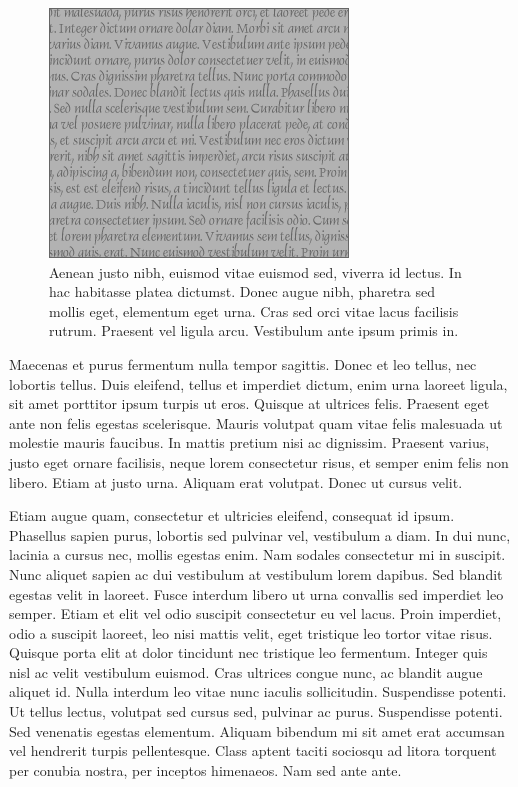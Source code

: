 \begin{figure}[t]
  \centering
  \includegraphics{figs/medium-rectangle-gray}
  \caption[Aenean justo nibh]{
    Aenean justo nibh, euismod vitae euismod sed, viverra id lectus.
In hac habitasse platea dictumst.
Donec augue nibh, pharetra sed mollis eget, elementum eget urna.
Cras sed orci vitae lacus facilisis rutrum.
Praesent vel ligula arcu.
Vestibulum ante ipsum primis in.
  }
\end{figure}

Maecenas et purus fermentum nulla tempor sagittis.
Donec et leo tellus, nec lobortis tellus.
Duis eleifend, tellus et imperdiet dictum, enim urna laoreet ligula, sit amet porttitor ipsum turpis ut eros.
Quisque at ultrices felis.
Praesent eget ante non felis egestas scelerisque.
Mauris volutpat quam vitae felis malesuada ut molestie mauris faucibus.
In mattis pretium nisi ac dignissim.
Praesent varius, justo eget ornare facilisis, neque lorem consectetur risus, et semper enim felis non libero.
Etiam at justo urna.
Aliquam erat volutpat.
Donec ut cursus velit.

Etiam augue quam, consectetur et ultricies eleifend, consequat id ipsum.
Phasellus sapien purus, lobortis sed pulvinar vel, vestibulum a diam.
In dui nunc, lacinia a cursus nec, mollis egestas enim.
Nam sodales consectetur mi in suscipit.
Nunc aliquet sapien ac dui vestibulum at vestibulum lorem dapibus.
Sed blandit egestas velit in laoreet.
Fusce interdum libero ut urna convallis sed imperdiet leo semper.
Etiam et elit vel odio suscipit consectetur eu vel lacus.
Proin imperdiet, odio a suscipit laoreet, leo nisi mattis velit, eget tristique leo tortor vitae risus.
Quisque porta elit at dolor tincidunt nec tristique leo fermentum.
Integer quis nisl ac velit vestibulum euismod.
Cras ultrices congue nunc, ac blandit augue aliquet id.
Nulla interdum leo vitae nunc iaculis sollicitudin.
Suspendisse potenti.
Ut tellus lectus, volutpat sed cursus sed, pulvinar ac purus.
Suspendisse potenti.
Sed venenatis egestas elementum.
Aliquam bibendum mi sit amet erat accumsan vel hendrerit turpis pellentesque.
Class aptent taciti sociosqu ad litora torquent per conubia nostra, per inceptos himenaeos.
Nam sed ante ante.


